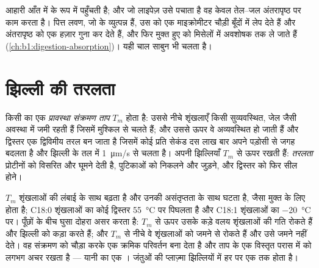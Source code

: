 \begin{example}[पित्त लवण]\label{ex:b1:lipids:bile}
आहारी  आँत में  के रूप में पहुँचती है; और जो लाइपेज़ उसे पचाता है
वह केवल तेल--जल अंतरापृष्ठ पर काम करता है। पित्त लवण, जो  के
 व्युत्पन्न हैं, उस  को एक माइक्रोमीटर चौड़ी बूँदों में लेप
देते हैं और अंतरापृष्ठ को एक हज़ार गुना कर देते हैं, और फिर मुक्त हुए
 को मिसेलों में अवशोषक  तक ले जाते हैं
(\cref{ch:b1:digestion-absorption})। यही चाल साबुन भी चलता है।
\end{example}

\section{झिल्ली की तरलता}

\begin{definition}\label{def:b1:lipids:fluidity}
किसी  का एक \emph{प्रावस्था संक्रमण ताप} $T_m$ होता है: उससे नीचे शृंखलाएँ किसी सुव्यवस्थित,
जेल जैसी अवस्था में जमी रहती हैं जिसमें  मुश्किल से चलते हैं; और
उससे ऊपर वे अव्यवस्थित हो जाती हैं और द्विस्तर एक द्विविमीय तरल बन जाता
है जिसमें कोई  प्रति सेकंड दस लाख बार अपने पड़ोसी से जगह बदलता है
और झिल्ली के तल में \qty{1}{\micro m/s} से चलता है।  अपनी
झिल्लियाँ $T_m$ से ऊपर रखती हैं: \emph{तरलता}
प्रोटीनों को विसरित और घूमने देती है, पुटिकाओं को निकलने और जुड़ने, और
द्विस्तर को फिर सील होने।
\end{definition}

\begin{proposition}[तरलता किससे तय होती है]\label{prop:b1:lipids:fluidityfactors}
$T_m$ शृंखलाओं की लंबाई के साथ बढ़ता है और उनकी असंतृप्तता के साथ घटता
है, जैसा मुक्त  के लिए होता है; C18:0 शृंखलाओं का कोई द्विस्तर
\qty{55}{\celsius} पर पिघलता है और C18:1 शृंखलाओं का
\qty{-20}{\celsius} पर। पूँछों के बीच घुसा  दोहरा असर करता
है: $T_m$ से ऊपर उसके कड़े वलय शृंखलाओं की गति रोकते हैं और झिल्ली को
कड़ा करते हैं; और $T_m$ से नीचे वे शृंखलाओं को जमने से रोकते हैं और उसे
जमने नहीं देते। वह संक्रमण को चौड़ा करके एक क्रमिक परिवर्तन बना देता है
और ताप के एक विस्तृत परास में  को लगभग अचर रखता है --- यानी  का
एक । जंतुओं की प्लाज़्मा झिल्लियों में हर  पर एक तक
 होता है।
\end{proposition}

